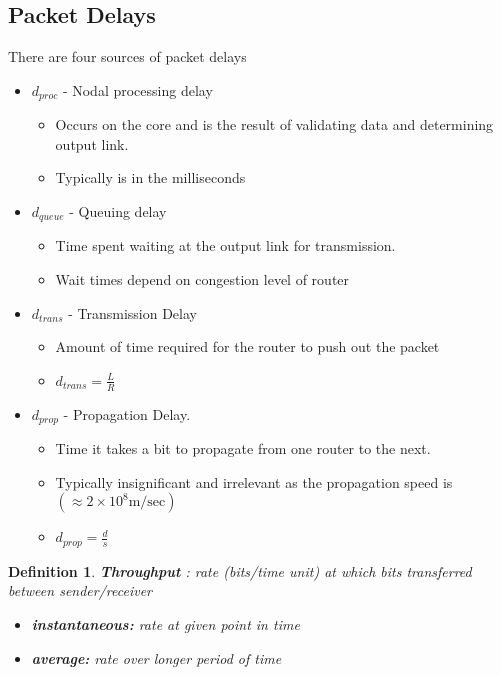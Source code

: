 \documentclass[twoside]{article}
\newtheorem{definition}[theorem]{Definition}
\begin{document}
\subsection{Packet Delays}

There are four sources of packet delays
\begin{itemize}
\item $d_{proc}$ - Nodal processing delay
\begin{itemize}
\item Occurs on the core and is the result of validating data and determining output link. 
\item Typically is in the milliseconds
\end{itemize}
\item $d_{queue}$ - Queuing delay
\begin{itemize}
\item Time spent waiting at the output link for transmission. 
\item Wait times depend on congestion level of router
\end{itemize}
\item $d_{trans}$ - Transmission Delay
\begin{itemize}
\item  Amount of time required for the router to push out the packet
\item $d_{trans} = \frac{L}{R}$ 
\end{itemize}
\item $d_{prop}$ - Propagation Delay. 
\begin{itemize}
\item Time it takes a bit to propagate from one router to the next.
\item Typically insignificant and irrelevant as the propagation speed is $(\approx 2 \times 10^8  \text{m/sec})$
\item $d_{prop} = \frac{d}{s}$
\end{itemize}
\end{itemize}

\begin{definition}
\textbf{Throughput} : rate (bits/time unit) at which bits transferred between sender/receiver 
\begin{itemize}
\item \textbf{instantaneous: } rate at given point in time
\item \textbf{average: } rate over longer period of time
\end{itemize}
\end{definition}
\end{document}
